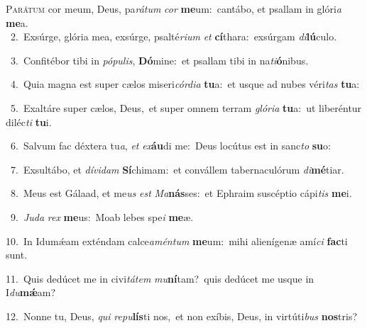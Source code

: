 \lettrine{\initial\textcolor{\initialcolor}{P}}{arátum} cor meum, Deus, pa\-\textit{rá}\-\textit{tum} \textit{cor} \textbf{me}\-um:~\star cantábo, et psallam in glóri\textit{a} \textbf{me}\-a.\\
{\numbfont\textcolor{\numbcolor}{~2.}}~Exsúrge, glória mea, exsúrge, psalté\-\textit{ri}\-\textit{um} \textit{et} \textbf{cí}\-thara:~\star exsúrgam \textit{di}\-\textbf{lú}culo.\par
{\numbfont\textcolor{\numbcolor}{~3.}}~Confitébor tibi in \textit{pó}\-\textit{pu}\textit{lis}, \textbf{Dó}\-mine:~\star et psallam tibi in na\-\textit{ti}\-\textbf{ó}nibus.\par
{\numbfont\textcolor{\numbcolor}{~4.}}~Quia magna est super cælos miseri\-\textit{cór}\-\textit{di}\textit{a} \textbf{tu}\-a:~\star et usque ad nubes véri\textit{tas} \textbf{tu}\-a:\par
{\numbfont\textcolor{\numbcolor}{~5.}}~Exaltáre super cælos, Deus,~\dagger et super omnem terram \textit{gló}\-\textit{ri}\textit{a} \textbf{tu}\-a:~\star ut liberéntur diléc\textit{ti} \textbf{tu}\-i.\par
{\numbfont\textcolor{\numbcolor}{~6.}}~Salvum fac déxtera tu\-\textit{a}\-, \textit{et} \textit{ex}\-\textbf{áu}di me:~\star Deus locútus est in sanc\textit{to} \textbf{su}\-o:\par
{\numbfont\textcolor{\numbcolor}{~7.}}~Exsultábo, et \textit{dí}\-\textit{vi}\textit{dam} \textbf{Sí}\-chimam:~\star et convállem tabernaculórum \textit{di}\-\textbf{mé}tiar.\par
{\numbfont\textcolor{\numbcolor}{~8.}}~Meus est Gálaad, et me\textit{us} \textit{est} \textit{Ma}\-\textbf{nás}ses:~\star et Ephraim suscéptio cápi\textit{tis} \textbf{me}\-i.\par
{\numbfont\textcolor{\numbcolor}{~9.}}~\-\textit{Ju}\-\textit{da} \textit{rex} \textbf{me}\-us:~\star Moab lebes spe\textit{i} \textbf{me}\-æ.\par
{\numbfont\textcolor{\numbcolor}{10.}}~In Idumǽam exténdam calce\-\textit{a}\-\textit{mén}\textit{tum} \textbf{me}\-um:~\star mihi alienígenæ amí\textit{ci} \textbf{fac}\-ti sunt.\par
{\numbfont\textcolor{\numbcolor}{11.}}~Quis dedúcet me in civi\-\textit{tá}\-\textit{tem} \textit{mu}\-\textbf{ní}tam?~\star quis dedúcet me usque in I\-\textit{du}\-\textbf{mǽ}am?\par
{\numbfont\textcolor{\numbcolor}{12.}}~Nonne tu, Deus, \textit{qui} \textit{re}\-\textit{pu}\textbf{lís}ti nos,~\star et non exíbis, Deus, in virtúti\textit{bus} \textbf{nos}\-tris?\par
